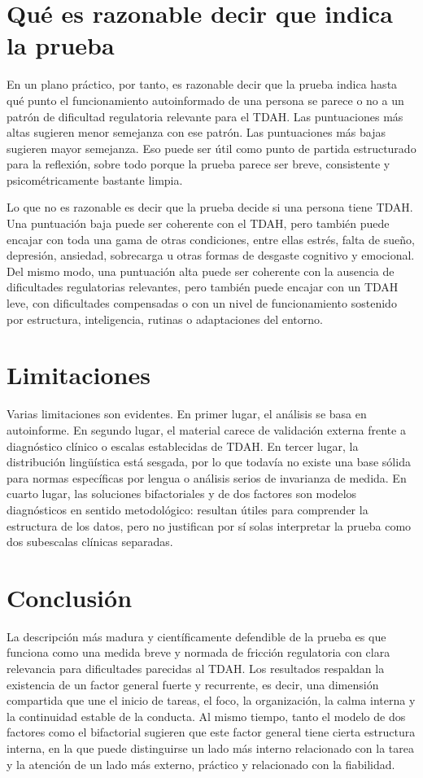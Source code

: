 \documentclass[11pt,a4paper]{article}
\begin{document}
\section{Qué es razonable decir que indica la prueba}
En un plano práctico, por tanto, es razonable decir que la prueba indica hasta qué punto el funcionamiento autoinformado de una persona se parece o no a un patrón de dificultad regulatoria relevante para el TDAH. Las puntuaciones más altas sugieren menor semejanza con ese patrón. Las puntuaciones más bajas sugieren mayor semejanza. Eso puede ser útil como punto de partida estructurado para la reflexión, sobre todo porque la prueba parece ser breve, consistente y psicométricamente bastante limpia.

Lo que no es razonable es decir que la prueba decide si una persona tiene TDAH. Una puntuación baja puede ser coherente con el TDAH, pero también puede encajar con toda una gama de otras condiciones, entre ellas estrés, falta de sueño, depresión, ansiedad, sobrecarga u otras formas de desgaste cognitivo y emocional. Del mismo modo, una puntuación alta puede ser coherente con la ausencia de dificultades regulatorias relevantes, pero también puede encajar con un TDAH leve, con dificultades compensadas o con un nivel de funcionamiento sostenido por estructura, inteligencia, rutinas o adaptaciones del entorno.

\section{Limitaciones}
Varias limitaciones son evidentes. En primer lugar, el análisis se basa en autoinforme. En segundo lugar, el material carece de validación externa frente a diagnóstico clínico o escalas establecidas de TDAH. En tercer lugar, la distribución lingüística está sesgada, por lo que todavía no existe una base sólida para normas específicas por lengua o análisis serios de invarianza de medida. En cuarto lugar, las soluciones bifactoriales y de dos factores son modelos diagnósticos en sentido metodológico: resultan útiles para comprender la estructura de los datos, pero no justifican por sí solas interpretar la prueba como dos subescalas clínicas separadas.

\section{Conclusión}
La descripción más madura y científicamente defendible de la prueba es que funciona como una medida breve y normada de fricción regulatoria con clara relevancia para dificultades parecidas al TDAH. Los resultados respaldan la existencia de un factor general fuerte y recurrente, es decir, una dimensión compartida que une el inicio de tareas, el foco, la organización, la calma interna y la continuidad estable de la conducta. Al mismo tiempo, tanto el modelo de dos factores como el bifactorial sugieren que este factor general tiene cierta estructura interna, en la que puede distinguirse un lado más interno relacionado con la tarea y la atención de un lado más externo, práctico y relacionado con la fiabilidad.
\end{document}
